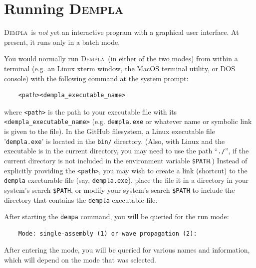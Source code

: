 \documentclass[letterpaper,11pt]{article}
\newcommand{\Dempla}{\textsc{Dempla}}
\begin{document}
\section{Running \Dempla} \label{sec:RunOval}
\Dempla\ is \emph{not} yet an interactive program with a graphical
user interface.
At present, it runs only in a batch mode.
%
\par
You would normally run \Dempla\ (in either of the two modes)
from within a terminal (e.g. an Linux xterm window, the
MacOS terminal utility,
or DOS console) with the following command at the system prompt:\\[-2ex]
\begin{verbatim}
    <path><dempla_executable_name>
\end{verbatim}
\rule{0ex}{3ex}where \texttt{<path>} is the path to your executable
file with its \texttt{<dempla\_executable\_name>}
(e.g. \texttt{dempla.exe} or whatever
name or symbolic link is given to the file).
In the GitHub filesystem,
a Linux executable file '\texttt{dempla.exe}'
is located in the \texttt{bin/} directory.
(Also, with Linux and the executable is in the current directory,
you may need to use the path ``\texttt{./}'',
if the current directory is not included in the environment
variable \texttt{\$PATH}.)
Instead of explicitly providing the \texttt{<path>}, you may wish to
create a link (shortcut) to the \texttt{dempla} execturable file
(say, \texttt{dempla.exe}),
place the file it in a directory in your system's search \texttt{\$PATH}, 
or modify your system's search \texttt{\$PATH} to include
the directory that contains the \texttt{dempla} executable file.
\par
After starting the \texttt{dempa} command, you
will be queried for the run mode:\\[-2ex]
%
\begin{verbatim}
    Mode: single-assembly (1) or wave propagation (2):
\end{verbatim}
%
\rule{0ex}{3ex}After entering the mode, you will be queried for various names
and information, which will
depend on the mode that was selected.
%
\end{document}

